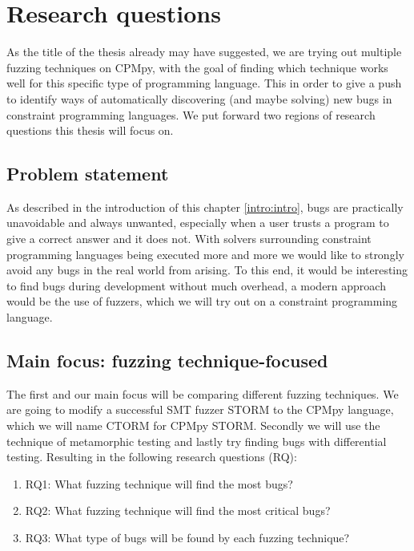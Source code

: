 \section{Research questions}
\label{intro:RQ:RQ’s}
As the title of the thesis already may have suggested, we are trying out multiple fuzzing techniques on CPMpy, with the goal of finding which technique works well for this specific type of programming language. This in order to give a push to identify ways of automatically discovering (and maybe solving) new bugs in constraint programming languages. We put forward two regions of research questions this thesis will focus on.

\subsection{Problem statement}
\label{intro:ProblemStatment}
As described in the introduction of this chapter \ref{intro:intro}, bugs are practically unavoidable and always unwanted, especially when a user trusts a program to give a correct answer and it does not. With solvers surrounding constraint programming languages being executed more and more we would like to strongly avoid any bugs in the real world from arising. To this end, it would be interesting to find bugs during development without much overhead, a modern approach would be the use of fuzzers, which we will try out on a constraint programming language.

\subsection{Main focus: fuzzing technique-focused}
\label{intro:RQ:MainFocus}
The first and our main focus will be comparing different fuzzing techniques. We are going to modify a successful SMT fuzzer STORM to the CPMpy language, which we will name CTORM for CPMpy STORM. Secondly we will use the technique of metamorphic testing and lastly try finding bugs with differential testing. Resulting in the following research questions (RQ): \newline
\begin{enumerate}
	\item RQ1: What fuzzing technique will find the most bugs?
	\item RQ2: What fuzzing technique will find the most critical bugs?
	\item RQ3: What type of bugs will be found by each fuzzing technique?
\end{enumerate}

